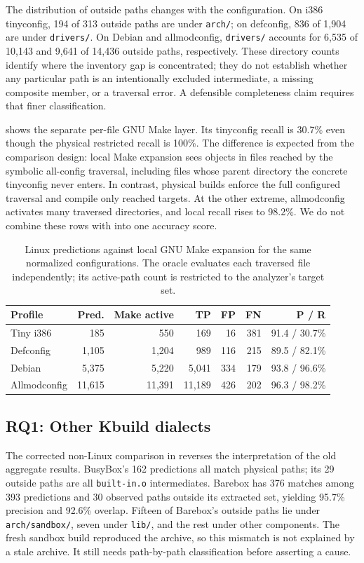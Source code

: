 \documentclass[acmsmall,screen,review]{acmart}
\begin{document}
The distribution of outside paths changes with the configuration. On i386 tinyconfig, 194 of 313 outside paths are under \texttt{arch/}; on defconfig, 836 of 1,904 are under \texttt{drivers/}. On Debian and allmodconfig, \texttt{drivers/} accounts for 6,535 of 10,143 and 9,641 of 14,436 outside paths, respectively. These directory counts identify where the inventory gap is concentrated; they do not establish whether any particular path is an intentionally excluded intermediate, a missing composite member, or a traversal error. A defensible completeness claim requires that finer classification.

 shows the separate per-file GNU Make layer. Its tinyconfig recall is 30.7\% even though the physical restricted recall is 100\%. The difference is expected from the comparison design: local Make expansion sees objects in files reached by the symbolic all-config traversal, including files whose parent directory the concrete tinyconfig never enters. In contrast, physical builds enforce the full configured traversal and compile only reached targets. At the other extreme, allmodconfig activates many traversed directories, and local recall rises to 98.2\%. We do not combine these rows with  into one accuracy score.

\begin{table}[t]
\centering\footnotesize
\caption{Linux predictions against local GNU Make expansion for the same normalized configurations. The oracle evaluates each traversed file independently; its active-path count is restricted to the analyzer's target set.}
\label{tab:linux-gmake}
\begin{tabular}{lrrrrrr}
\toprule
Profile & Pred. & Make active & TP & FP & FN & P / R \\
\midrule
Tiny i386 & 185 & 550 & 169 & 16 & 381 & 91.4 / 30.7\% \\
Defconfig & 1,105 & 1,204 & 989 & 116 & 215 & 89.5 / 82.1\% \\
Debian & 5,375 & 5,220 & 5,041 & 334 & 179 & 93.8 / 96.6\% \\
Allmodconfig & 11,615 & 11,391 & 11,189 & 426 & 202 & 96.3 / 98.2\% \\
\bottomrule
\end{tabular}
\end{table}

\subsection{RQ1: Other Kbuild dialects}
\label{sec:eval:nonlinux}
The corrected non-Linux comparison in  reverses the interpretation of the old aggregate results. BusyBox's 162 predictions all match physical paths; its 29 outside paths are all \texttt{built-in.o} intermediates. Barebox has 376 matches among 393 predictions and 30 observed paths outside its extracted set, yielding 95.7\% precision and 92.6\% overlap. Fifteen of Barebox's outside paths lie under \texttt{arch/sandbox/}, seven under \texttt{lib/}, and the rest under other components. The fresh sandbox build reproduced the archive, so this mismatch is not explained by a stale archive. It still needs path-by-path classification before asserting a cause.
\end{document}
